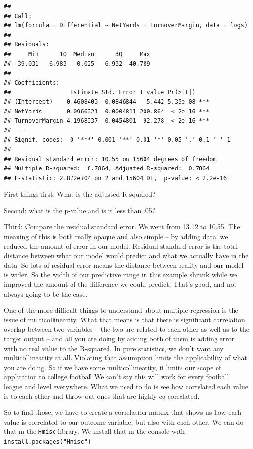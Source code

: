 \documentclass[
]{book}
\begin{document}
\begin{verbatim}
## 
## Call:
## lm(formula = Differential ~ NetYards + TurnoverMargin, data = logs)
## 
## Residuals:
##     Min      1Q  Median      3Q     Max 
## -39.031  -6.983  -0.025   6.932  40.789 
## 
## Coefficients:
##                 Estimate Std. Error t value Pr(>|t|)    
## (Intercept)    0.4608403  0.0846844   5.442 5.35e-08 ***
## NetYards       0.0966321  0.0004811 200.864  < 2e-16 ***
## TurnoverMargin 4.1968337  0.0454801  92.278  < 2e-16 ***
## ---
## Signif. codes:  0 '***' 0.001 '**' 0.01 '*' 0.05 '.' 0.1 ' ' 1
## 
## Residual standard error: 10.55 on 15604 degrees of freedom
## Multiple R-squared:  0.7864, Adjusted R-squared:  0.7864 
## F-statistic: 2.872e+04 on 2 and 15604 DF,  p-value: < 2.2e-16
\end{verbatim}

First things first: What is the adjusted R-squared?

Second: what is the p-value and is it less than .05?

Third: Compare the residual standard error. We went from 13.12 to 10.55. The meaning of this is both really opaque and also simple -- by adding data, we reduced the amount of error in our model. Residual standard error is the total distance between what our model would predict and what we actually have in the data. So lots of residual error means the distance between reality and our model is wider. So the width of our predictive range in this example shrank while we improved the amount of the difference we could predict. That's good, and not always going to be the case.

One of the more difficult things to understand about multiple regression is the issue of multicollinearity. What that means is that there is significant correlation overlap between two variables -- the two are related to each other as well as to the target output -- and all you are doing by adding both of them is adding error with no real value to the R-squared. In pure statistics, we don't want any multicollinearity at all. Violating that assumption limits the applicability of what you are doing. So if we have some multicollinearity, it limits our scope of application to college football We can't say this will work for every football league and level everywhere. What we need to do is see how correlated each value is to each other and throw out ones that are highly co-correlated.

So to find those, we have to create a correlation matrix that shows us how each value is correlated to our outcome variable, but also with each other. We can do that in the \texttt{Hmisc} library. We install that in the console with \texttt{install.packages("Hmisc")}
\end{document}
